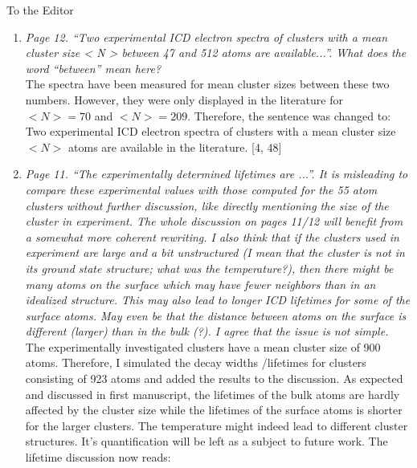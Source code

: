 \documentclass[DIN,pagenumber=false,parskip=half,fromalign=left,fromphone=true,fromemail=true,fromurl=false,fromlogo=false,fromrule=false]{scrlttr2}
\begin{document}
\begin{letter}{To the Editor}
\begin{enumerate}
 \item \emph{Page 12. “Two experimental ICD electron spectra of clusters with a mean cluster size < N > between 47 and 512 atoms are available...”. What does the word “between” mean here?}\\
       The spectra have been measured for mean cluster sizes between these two
       numbers. However, they were only displayed in the literature for $<N>=70$
       and $<N>=209$. Therefore, the sentence was changed to:\\
       Two experimental ICD electron spectra of clusters
       with a mean cluster size $<N>$ {\color{blue}{of 70 and 209}} atoms
       are available in the literature.
       [4, 48]

 \item \emph{Page 11. “The experimentally determined lifetimes are ...”. It is misleading to compare these experimental values with those computed for the 55 atom clusters without further discussion, like directly mentioning the size of the cluster in experiment. The whole discussion on pages 11/12 will benefit from a somewhat more coherent rewriting. I also think that if the clusters used in experiment are large and a bit unstructured (I mean that the cluster is not in its ground state structure; what was the temperature?), then there might be many atoms on the surface which may have fewer neighbors than in an idealized structure. This may also lead to longer ICD lifetimes for some of the surface atoms. May even be that the distance between atoms on the surface is different (larger) than in the bulk (?). I agree that the issue is not simple.}\\
       The experimentally investigated clusters have a mean cluster size of 900
       atoms. Therefore, I simulated the decay widths /lifetimes for clusters
       consisting of 923 atoms and added the results to the discussion.
       As expected and discussed in first manuscript, the lifetimes of the bulk
       atoms are hardly affected by the cluster size while the lifetimes of the
       surface atoms is shorter for the larger clusters. The temperature might
       indeed lead to different cluster structures. It's quantification will be
       left as a subject to future work.
       The lifetime discussion now reads:\\
{}
\end{enumerate}
\end{letter}
\end{document}
